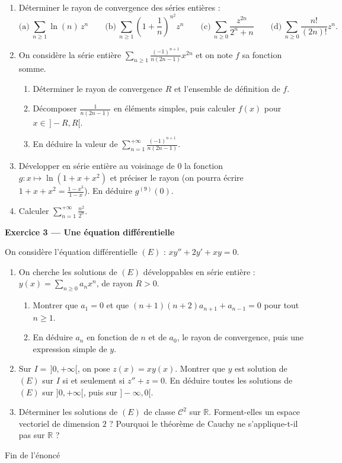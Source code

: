 \documentclass[a4paper,11pt]{article}
\numberwithin{equation}{section}
\numberwithin{figure}{section}
\numberwithin{table}{section}
\theoremstyle{enonce}
\theoremstyle{exemple}
\theoremstyle{remarque}
\newcommand{\R}{\mathbb{R}}
\newcommand{\Partie}[1]{\par\needspace{5\baselineskip}\vspace{1.1em}\noindent
  {\sffamily\bfseries\large\color{Bleu}#1}\par\vspace{2pt}{\color{Filet}\rule{\linewidth}{0.4pt}}\par\smallskip}
\begin{document}
\begin{enumerate}
\item Déterminer le rayon de convergence des séries entières :
\[\text{(a)}\ \sum_{n\geq1}\ln(n)\,z^n\qquad\text{(b)}\ \sum_{n\geq1}\left(1+\frac1n\right)^{n^2}z^n\qquad\text{(c)}\ \sum_{n\geq0}\frac{z^{2n}}{2^n+n}\qquad
\text{(d)}\ \sum_{n\geq0}\frac{n!}{(2n)!}z^n.\]
\item On considère la série entière $\displaystyle\sum_{n\geq1}\frac{(-1)^{n+1}}{n(2n-1)}x^{2n}$ et on note $f$ sa fonction somme.
\begin{enumerate}[label=(\alph*)]
\item Déterminer le rayon de convergence $R$ et l'ensemble de définition de $f$.
\item Décomposer $\frac1{n(2n-1)}$ en éléments simples, puis calculer $f(x)$ pour $x\in\,]-R,R[$.
\item En déduire la valeur de $\displaystyle\sum_{n=1}^{+\infty}\frac{(-1)^{n+1}}{n(2n-1)}$.
\end{enumerate}
\item Développer en série entière au voisinage de $0$ la fonction $g:x\mapsto\ln(1+x+x^2)$ et préciser le rayon (on pourra écrire
$1+x+x^2=\frac{1-x^3}{1-x}$). En déduire $g^{(9)}(0)$.
\item Calculer $\displaystyle\sum_{n=1}^{+\infty}\frac{n^2}{2^n}$.
\end{enumerate}

\Partie{Exercice 3 — Une équation différentielle}

On considère l'équation différentielle $(E)$ : $xy''+2y'+xy=0$.
\begin{enumerate}
\item On cherche les solutions de $(E)$ développables en série entière : $y(x)=\sum_{n\geq0}a_nx^n$, de rayon $R>0$.
\begin{enumerate}[label=(\alph*)]
\item Montrer que $a_1=0$ et que $(n+1)(n+2)a_{n+1}+a_{n-1}=0$ pour tout $n\geq1$.
\item En déduire $a_n$ en fonction de $n$ et de $a_0$, le rayon de convergence, puis une expression simple de $y$.
\end{enumerate}
\item Sur $I=\,]0,+\infty[$, on pose $z(x)=xy(x)$. Montrer que $y$ est solution de $(E)$ sur $I$ si et seulement si $z''+z=0$.
En déduire toutes les solutions de $(E)$ sur $]0,+\infty[$, puis sur $]-\infty,0[$.
\item Déterminer les solutions de $(E)$ de classe $\mathcal C^2$ sur $\R$. Forment-elles un espace vectoriel de dimension $2$ ?
Pourquoi le théorème de Cauchy ne s'applique-t-il pas sur $\R$ ?
\end{enumerate}

\vfill
\begin{center}\sffamily\small\color{Gris}Fin de l'énoncé\end{center}
\end{document}
